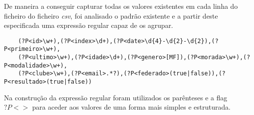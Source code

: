 De maneira a conseguir capturar todas os valores existentes em cada linha do ficheiro
do ficheiro \textit{csv}, foi analisado o padrão existente e a partir deste especificada uma expressão regular 
capaz de os agrupar.

\begin{verbatim}
    (?P<id>\w+),(?P<index>\d+),(?P<date>\d{4}-\d{2}-\d{2}),(?P<primeiro>\w+),
    (?P<ultimo>\w+),(?P<idade>\d+),(?P<genero>[MF]),(?P<morada>\w+),(?P<modalidade>\w+),
    (?P<clube>\w+),(?P<email>.*?),(?P<federado>(true|false)),(?P<resultado>(true|false))
\end{verbatim}

Na construção da expressão regular foram utilizados os parênteses e a flag $?P<>$
para aceder aos valores de uma forma mais simples e estruturada.